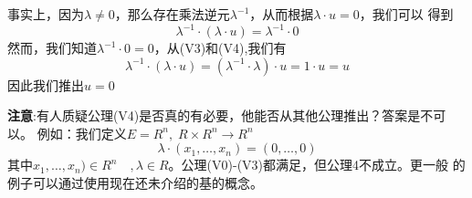 事实上，因为$\lambda \neq 0$，那么存在乘法逆元$\lambda^{-1}$，从而根据$\lambda\cdot u = 0$，我们可以
得到
\[
  \lambda^{-1}\cdot (\lambda\cdot u)= \lambda^{-1}\cdot0
  \]
  然而，我们知道$\lambda^{-1}\cdot0=0$，从(V3)和(V4),我们有
  \[
  \lambda^{-1}\cdot (\lambda\cdot u)= (\lambda^{-1}\cdot\lambda)\cdot u = 1\cdot u = u
  \]
  因此我们推出$u=0$

\textbf{注意}:有人质疑公理(V4)是否真的有必要，他能否从其他公理推出？答案是不可以。
例如：我们定义$E=R^n,\;R\times R^n\to R^n$
\[
  \lambda \cdot (x_1,\ldots ,x_n) = (0,\ldots,0)
  \]
  其中$x_1,\ldots ,x_n) \in R^n\quad,\lambda \in R$。公理(V0)-(V3)都满足，但公理4不成立。更一般
  的例子可以通过使用现在还未介绍的基的概念。
  